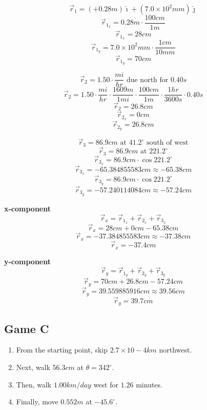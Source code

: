 \documentclass[11pt, letterpaper, includehead]{article}
\begin{document}
\begin{multicols}{2}
  $$\vec{r}_1 = (+0.28m)\hat\imath +(7.0\times10^2mm)\hat\jmath$$
  $$\vec{r}_{1_x} = 0.28m\cdot\frac{100cm}{1m}$$
  $$\vec{r}_{1_x} = 28cm$$
  $$\vec{r}_{1_y} = 7.0\times10^2mm\cdot\frac{1cm}{10mm}$$
  $$\vec{r}_{1_y} = 70cm$$

  \columnbreak
  $$\vec{r}_2 = 1.50\cdot\frac{mi}{hr} \text{ due north for }0.40s$$
  $$\vec{r}_2 = 1.50\cdot\frac{mi}{hr}\cdot\frac{1609m}{1mi}\cdot\frac{100cm}{1m}\cdot\frac{1hr}{3600s}\cdot0.40s$$
  $$\vec{r}_2 = 26.8cm$$
  $$\vec{r}_{2_x} = 0cm$$
  $$\vec{r}_{2_y} = 26.8cm$$
\end{multicols}

\hspace{0.5cm}

$$\vec{r}_3 = 86.9cm \text{ at } 41.2^{\circ} \text{ south of west}$$
$$\vec{r}_3 = 86.9cm \text{ at } 221.2^{\circ}$$
$$\vec{r}_{3_x} = 86.9cm\cdot\cos221.2^{\circ}$$
$$\vec{r}_{3_x} = -65.384855583cm \approx -65.38cm$$
$$\vec{r}_{3_y} = 86.9cm\cdot\cos221.2^{\circ}$$
$$\vec{r}_{3_y} = -57.240114084cm \approx -57.24cm$$

\hspace{0.5cm}

\begin{multicols}{2}
  \centering\textbf{x-component}
  $$\vec{r}_x = \vec{r}_{1_x} + \vec{r}_{2_x} + \vec{r}_{3_x}$$
  $$\vec{r}_x = 28cm + 0cm -65.38cm$$
  $$\vec{r}_x = -37.384855583cm \approx -37.38cm$$
  $$\boxed{\vec{r}_x = -37.4cm}$$

  \centering\textbf{y-component}
  $$\vec{r}_y = \vec{r}_{1_y} + \vec{r}_{2_y} + \vec{r}_{3_y}$$
  $$\vec{r}_y = 70cm + 26.8cm - 57.24cm$$
  $$\vec{r}_y = 39.559885916cm \approx 39.56cm$$
  $$\boxed{\vec{r}_y = 39.7cm} $$
\end{multicols}

\pagebreak
\subsection{Game C} %
\begin{enumerate}
  \item From the starting point, skip $2.7 \times 10-4 km$ northwest.
  \item Next, walk $56.3 cm$ at $\theta = 342^{\circ}$.
  \item Then, walk $1.00 km/day$ west for $1.26$ minutes.
  \item Finally, move $0.552 m$ at $-45.6^{\circ}$.
\end{enumerate}
\end{document}

